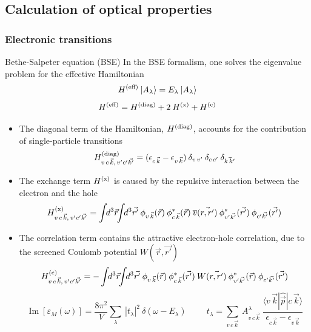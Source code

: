 \documentclass[noamsthm,8pt,t,xcolor={dvipsnames}]{beamer}
\begin{document}
\subsection{Calculation of optical properties}
\begin{frame}
   \frametitle{Electronic transitions}
   \vspace{-0.2cm}
   \begin{block}{Bethe-Salpeter equation (BSE)}
      In the BSE formalism, one solves the eigenvalue problem for the effective Hamiltonian
      $$ H ^{\rm (eff)}\: | A_{\lambda} \rangle= E_{\lambda}\: |A_{\lambda}\rangle $$
   $$ H ^{\rm (eff)} = H ^{\rm (diag)}+2\:H ^{\rm (x)} + H ^{\rm (c)} $$
   \end{block}
   \begin{itemize}
      \item The diagonal term of the Hamiltonian, $H^{\rm (diag)}$, accounts for the contribution of single-particle transitions
   $$ H^{\rm (diag)}_{v\,c\,\vec{k},\,v'c'\vec{k'}} = (\epsilon_{c\,\vec{k}} - \epsilon_{v\,\vec{k}}) \:\delta_{v\,v'}\:\delta_{c\,c'}\:\delta_{\vec{k\,k'}} $$
      \item The exchange term $H^{\rm (x)}$ is caused by the repulsive interaction between the electron and the hole
   $$ H^{\rm (x)}_{v\,c\,\vec{k},\,v'c'\vec{k'}} = \int \!\!d^{3}\vec{r}\!\!\int\!\! d^{3}\vec{r'} \:\phi_{v\,\vec{k}}(\vec{r})\: \phi_{c\,\vec{k}}^* (\vec{r})\: \overline{v}(\vec{r,r'}) \:\phi^*_{v'\vec{k'}}(\vec{r'})\: \phi_{c'\vec{k'}} (\vec{r'}) $$
      \item The correlation term contains the attractive electron-hole correlation, due to the screened Coulomb potential $W(\vec{r},\vec{r'})$
$$ H^{\rm (c)}_{v\,c\,\vec{k},\,v'c'\vec{k'}} = -\int\!\! d^{3}\vec{r}\!\!\int\!\! d^{3}\vec{r'}\: \phi_{v\,\vec{k}}(\vec{r})\: \phi_{c\,\vec{k}}^* (\vec{r'}) \:W(\vec{r,r'}) \:\phi_{v'\vec{k'}}^*(\vec{r}) \:\phi_{c'\vec{k'}} (\vec{r'}) $$
   $$ \operatorname{Im} \left[\varepsilon_{\!M}(\omega)\right] = \dfrac{8\pi^2}{V}\sum_{\lambda}\: |t_{\lambda}|^2\:\delta(\omega - E_{\lambda}) \hspace{1cm}
   t_{\lambda}=\sum_{v\,c\,\vec{k}}\:A^{\lambda}_{v\,c\,\vec{k}}\: \dfrac{\langle v\,\vec{k}|\hat{\vec{p}}|c\,\vec{k}\rangle}{\epsilon_{c\,\vec{k}} - \epsilon_{v\,\vec{k}}} $$
   \end{itemize}
\end{frame}
\end{document}

